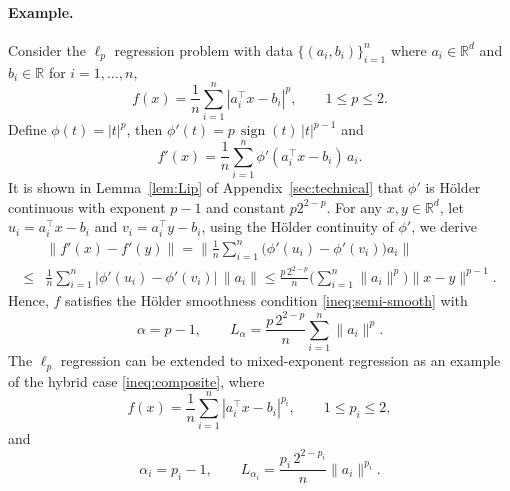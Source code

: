 \documentclass[11pt,letterpaper]{article}
\newcommand{\R}{\mathbb{R}}
\begin{document}
\paragraph{Example.}
Consider the $\ell_p$ regression problem with data $\{(a_i,b_i)\}_{i=1}^n$ where $a_i\in \R^d$ and $b_i \in \R$ for $i=1,\ldots,n$,
\begin{equation}\label{eq:lp}
    f(x) = \frac{1}{n}\sum_{i=1}^n |a_i^\top x - b_i|^p,
\qquad 1 \le p \le 2.
\end{equation}
Define $\phi(t) = |t|^p$, then $\phi'(t) = p\,\operatorname{sign}(t)\,|t|^{p-1}$ and
\[
f'(x) = \frac{1}{n}\sum_{i=1}^n \phi'(a_i^\top x - b_i)\,a_i.
\]
It is shown in Lemma~\ref{lem:Lip} of Appendix~\ref{sec:technical} that $\phi'$ is Hölder continuous with exponent $p-1$ and constant $p 2^{2-p}$.
For any $x,y \in \R^d$, let $u_i = a_i^\top x - b_i$ and $v_i = a_i^\top y - b_i$, using the Hölder continuity of $\phi'$,  we derive
\begin{align*}
&\|f'(x) - f'(y)\|
= \Big\| \frac{1}{n}\sum_{i=1}^n 
  \big(\phi'(u_i) - \phi'(v_i)\big)a_i \Big\| \\
\le &\frac{1}{n}\sum_{i=1}^n
   |\phi'(u_i) - \phi'(v_i)|\,\|a_i\| 
\le \frac{p\,2^{2-p}}{n}
   \Big(\sum_{i=1}^n \|a_i\|^p\Big)
   \|x - y\|^{p-1}.
\end{align*}
Hence, $f$ satisfies the Hölder smoothness condition \eqref{ineq:semi-smooth} with
\[
\alpha = p-1,\qquad
L_\alpha
= \frac{p\,2^{2-p}}{n}\sum_{i=1}^n \|a_i\|^{p}.
\]
The $\ell_p$ regression can be extended to mixed-exponent regression as an example of the hybrid case \eqref{ineq:composite}, where 
\begin{equation}\label{eq:mixed}
    f(x) = \frac{1}{n}\sum_{i=1}^{n} |a_i^\top x - b_i|^{p_i}, 
\qquad 1 \le p_i \le 2,
\end{equation}
and
\[
\alpha_i = p_i-1,\qquad
L_{\alpha_i} = \frac{p_i\,2^{2-p_i}}{n} \|a_i\|^{p_i}.
\]

\end{document}
